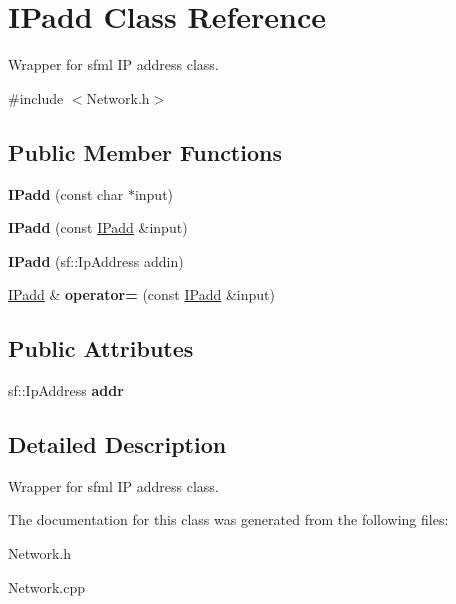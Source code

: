 \hypertarget{class_i_padd}{}\section{I\+Padd Class Reference}
\label{class_i_padd}


Wrapper for sfml IP address class.  




{\ttfamily \#include $<$Network.\+h$>$}

\subsection*{Public Member Functions}
\begin{DoxyCompactItemize}
\item 
\hypertarget{class_i_padd_a1ab48dbb7feb2cacadeee14013b9c674}{}\label{class_i_padd_a1ab48dbb7feb2cacadeee14013b9c674} 
{\bfseries I\+Padd} (const char $\ast$input)
\item 
\hypertarget{class_i_padd_a239a6d6d6635bc580058d23ff32adf10}{}\label{class_i_padd_a239a6d6d6635bc580058d23ff32adf10} 
{\bfseries I\+Padd} (const \hyperlink{class_i_padd}{I\+Padd} \&input)
\item 
\hypertarget{class_i_padd_adbed9e60221ea1e5ac3464bfe17fdcf5}{}\label{class_i_padd_adbed9e60221ea1e5ac3464bfe17fdcf5} 
{\bfseries I\+Padd} (sf\+::\+Ip\+Address addin)
\item 
\hypertarget{class_i_padd_a19c791cae61178b0598fad23be2d0e8e}{}\label{class_i_padd_a19c791cae61178b0598fad23be2d0e8e} 
\hyperlink{class_i_padd}{I\+Padd} \& {\bfseries operator=} (const \hyperlink{class_i_padd}{I\+Padd} \&input)
\end{DoxyCompactItemize}
\subsection*{Public Attributes}
\begin{DoxyCompactItemize}
\item 
\hypertarget{class_i_padd_a4b9088ff481bb7c79e92e0d2f06faae1}{}\label{class_i_padd_a4b9088ff481bb7c79e92e0d2f06faae1} 
sf\+::\+Ip\+Address {\bfseries addr}
\end{DoxyCompactItemize}


\subsection{Detailed Description}
Wrapper for sfml IP address class. 

The documentation for this class was generated from the following files\+:\begin{DoxyCompactItemize}
\item 
Network.\+h\item 
Network.\+cpp\end{DoxyCompactItemize}
